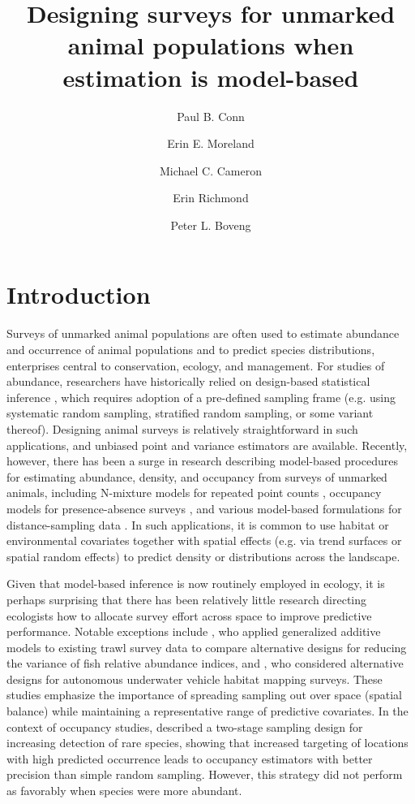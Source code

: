 \documentclass[fleqn,10pt]{wlpeerj}
\title{Designing surveys for unmarked animal populations when estimation is model-based}
\author[1]{Paul B. Conn}
\author[1]{Erin E. Moreland}
\author[1]{Michael C. Cameron}
\author[1]{Erin Richmond}
\author[1]{Peter L. Boveng}
\affil[1]{National Marine Mammal Laboratory, NOAA-NMFS, Alaska Fisheries Science Center, 7600 Sand Point Way NE, Seattle, WA 98115 USA}
\begin{document}
\flushbottom
\maketitle
\thispagestyle{empty}

\section*{Introduction}

Surveys of unmarked animal populations are often used to estimate abundance and occurrence of animal populations and to predict species distributions, enterprises central to conservation, ecology, and management. For studies of abundance, researchers have historically relied on design-based statistical inference \citep[e.g.][]{Cochran1977}, which requires adoption of a pre-defined sampling frame (e.g. using systematic random sampling, stratified random sampling, or some variant thereof).  Designing animal surveys is relatively straightforward in such applications, and unbiased point and variance estimators are available.  Recently, however, there has been a surge in research describing model-based procedures for estimating abundance, density, and occupancy from surveys of unmarked animals, including N-mixture models for repeated point counts \citep{Royle2004a}, occupancy models for presence-absence surveys \citep{MacKenzie2002,JohnsonEtAl2013}, and various model-based formulations for distance-sampling data \citep{HedleyBuckland2004,MillerEtAl2013,JohnsonEtAl2010}.  In such applications, it is common to use habitat or environmental covariates together with spatial effects (e.g. via trend surfaces or spatial random effects) to predict density or distributions across the landscape.  

Given that model-based inference is now routinely employed in ecology, it is perhaps surprising that there has been relatively little research directing ecologists how to allocate survey effort across space to improve predictive performance.  Notable exceptions include \citet{PeelEtAl2013}, who applied generalized additive models \citep[GAMs;][]{HastieTibshirani1999,Wood2006} to existing trawl survey data to compare alternative designs for reducing the variance of fish relative abundance indices, and \citet{FosterEtAl2014}, who considered alternative designs for autonomous underwater vehicle habitat mapping surveys.  These studies emphasize the importance of spreading sampling out over space (spatial balance) while maintaining a representative range of predictive covariates.
In the context of occupancy studies, \citet{PacificiEtAl2012} described a two-stage sampling design for increasing detection of rare species, showing that increased targeting of locations with high predicted occurrence  leads to occupancy estimators with better precision than simple random sampling.  However, this strategy did not perform as favorably when species were more abundant.
\end{document}
